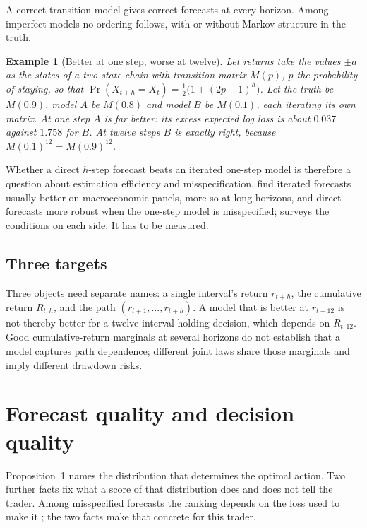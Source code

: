 \documentclass[11pt]{article}
\newtheorem{example}{Example}
\begin{document}
A correct transition model gives correct forecasts at every horizon. Among imperfect models no ordering follows, with or without Markov structure in the truth.

\begin{example}[Better at one step, worse at twelve]
Let returns take the values $\pm a$ as the states of a two-state chain with transition matrix $M(p)$, $p$ the probability of staying, so that $\Pr(X_{t+h} = X_t) = \tfrac{1}{2}\big(1 + (2p-1)^h\big)$. Let the truth be $M(0.9)$, model $A$ be $M(0.8)$ and model $B$ be $M(0.1)$, each iterating its own matrix. At one step $A$ is far better: its excess expected log loss is about $0.037$ against $1.758$ for $B$. At twelve steps $B$ is exactly right, because $M(0.1)^{12} = M(0.9)^{12}$.
\end{example}

Whether a direct $h$-step forecast beats an iterated one-step model is therefore a question about estimation efficiency and misspecification. \citet{marcellino2006} find iterated forecasts usually better on macroeconomic panels, more so at long horizons, and direct forecasts more robust when the one-step model is misspecified; \citet{chevillon2007} surveys the conditions on each side. It has to be measured.

\subsection{Three targets}

Three objects need separate names: a single interval's return $r_{t+h}$, the cumulative return $R_{t,h}$, and the path $(r_{t+1}, \dots, r_{t+h})$. A model that is better at $r_{t+12}$ is not thereby better for a twelve-interval holding decision, which depends on $R_{t,12}$. Good cumulative-return marginals at several horizons do not establish that a model captures path dependence; different joint laws share those marginals and imply different drawdown risks.

\section{Forecast quality and decision quality}

Proposition~1 names the distribution that determines the optimal action. Two further facts fix what a score of that distribution does and does not tell the trader. Among misspecified forecasts the ranking depends on the loss used to make it \citep{patton2020}; the two facts make that concrete for this trader.
\end{document}
